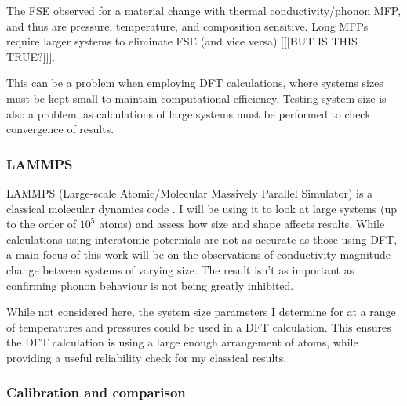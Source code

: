 The FSE observed for a material change with thermal conductivity/phonon MFP, and thus are pressure, temperature, and composition sensitive. Long MFPs require larger systems to eliminate FSE (and vice versa) [[[BUT IS THIS TRUE?]]].

This can be a problem when employing DFT calculations, where systems sizes must be kept small to maintain computational efficiency. Testing system size is also a problem, as calculations of large systems must be performed to check convergence of results.

\subsubsection{LAMMPS}

LAMMPS (Large-scale Atomic/Molecular Massively Parallel Simulator) is a classical molecular dynamics code \citep{Plimpton1995}. I will be using it to look at large systems (up to the order of $10^5$ atoms) and assess how size and shape affects results. While calculations using interatomic poternials are not as accurate as those using DFT, a main focus of this work will be on the observations of conductivity magnitude change between systems of varying size. The \wmks result isn't as important as confirming phonon behaviour is not being greatly inhibited. 

While not considered here, the system size parameters I determine for \bdgs at a range of temperatures and pressures could be used in a DFT calculation. This ensures the DFT calculation is using a large enough arrangement of atoms, while providing a useful reliability check for my classical results. 



\subsubsection{Calibration and comparison}

